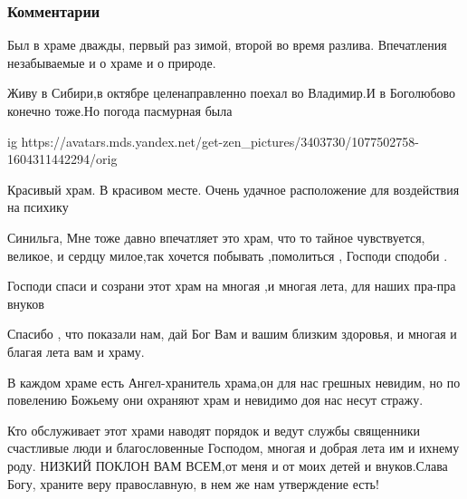  
 
 
 
 

\clearpage
\subsubsection{Комментарии}
\label{sec:14_10_2020.sites.ru.zen_yandex.yz.posad.1.pokrov_na_nerli.comments}

\begin{itemize}

Был в храме дважды, первый раз зимой, второй во время разлива. Впечатления
незабываемые и о храме и о природе.


Живу в Сибири,в октябре целенаправленно поехал во Владимир.И в Боголюбово конечно тоже.Но погода пасмурная была

\ifcmt
  ig https://avatars.mds.yandex.net/get-zen_pictures/3403730/1077502758-1604311442294/orig
\fi


Красивый храм. В красивом месте. Очень удачное расположение для воздействия на
психику


Синильга, Мне тоже давно впечатляет это храм, что то тайное чувствуется,
великое, и сердцу милое,так хочется побывать ,помолиться ,
Господи сподоби .

Господи спаси и созрани этот храм на многая ,и многая лета, для наших пра-пра
внуков

Спасибо , что показали нам, дай Бог Вам и вашим близким здоровья, и многая и
благая лета вам и храму.

В каждом храме есть Ангел-хранитель храма,он для нас грешных невидим, но по
повелению Божьему они охраняют храм и невидимо доя нас несут
стражу.

Кто обслуживает этот храми наводят порядок и ведут службы священники счастливые
люди и благословенные Господом, многая и добрая лета им и
ихнему роду. НИЗКИЙ ПОКЛОН ВАМ ВСЕМ,от меня и от моих детей и
внуков.Слава Богу, храните веру православную, в нем же нам
утверждение есть!


\end{itemize}
